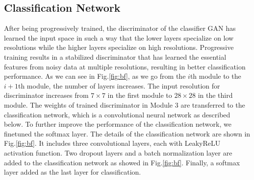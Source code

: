 \documentclass[runningheads]{llncs}
\begin{document}
\subsection{Classification Network}\label{class}
After being progressively trained, the discriminator of the classifier GAN  has learned   the input space in such a way that the lower layers specialize on low resolutions while the higher layers specialize on high resolutions.   Progressive training results in a stabilized  discriminator that has  learned the essential features from noisy data at multiple resolutions, resulting in better classification performance. As we can see in Fig.\ref{fig:bf},  as we go from the $i$th module to the $i+1$th module, the number of layers increases. The input resolution  for discriminator increases from $7 \times 7$ in the first module to $28 \times 28$ in the third module.  The  weights of trained discriminator  in Module 3 are transferred to the  classification network, which is a convolutional neural network as described below.    To further improve the performance of the classification network, we finetuned the softmax layer. 
The details of the  classification network are shown  in Fig.\ref{fig:bf}. It includes three convolutional layers,  each  with LeakyReLU activation function.   Two dropout layers and a batch normalization layer are added to the classification network as showed in Fig.\ref{fig:bf}. Finally, a softmax layer added as the last layer for classification.
\end{document}
